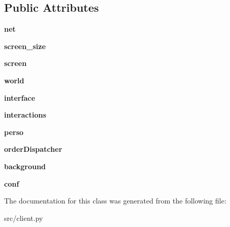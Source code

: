 \subsection*{\-Public \-Attributes}
\begin{DoxyCompactItemize}
\item 
\hypertarget{classsrc_1_1client_1_1_client_a22be7470a4f70a1cd0a5c159221e2080}{{\bfseries net}}\label{classsrc_1_1client_1_1_client_a22be7470a4f70a1cd0a5c159221e2080}

\item 
\hypertarget{classsrc_1_1client_1_1_client_af3c8cfb4d4f64c89d220255c940aed00}{{\bfseries screen\-\_\-size}}\label{classsrc_1_1client_1_1_client_af3c8cfb4d4f64c89d220255c940aed00}

\item 
\hypertarget{classsrc_1_1client_1_1_client_a9abfebcb16149fe59da9775af7ea6a8e}{{\bfseries screen}}\label{classsrc_1_1client_1_1_client_a9abfebcb16149fe59da9775af7ea6a8e}

\item 
\hypertarget{classsrc_1_1client_1_1_client_a0c840b0412f44f9220d5c8e7e346527c}{{\bfseries world}}\label{classsrc_1_1client_1_1_client_a0c840b0412f44f9220d5c8e7e346527c}

\item 
\hypertarget{classsrc_1_1client_1_1_client_a78caa6f9fe676a4af8a46c916b1cb413}{{\bfseries interface}}\label{classsrc_1_1client_1_1_client_a78caa6f9fe676a4af8a46c916b1cb413}

\item 
\hypertarget{classsrc_1_1client_1_1_client_ad17d0fea293dd7c11c67a8783530f203}{{\bfseries interactions}}\label{classsrc_1_1client_1_1_client_ad17d0fea293dd7c11c67a8783530f203}

\item 
\hypertarget{classsrc_1_1client_1_1_client_a87fcde6757dca7443d16211dfcb0780f}{{\bfseries perso}}\label{classsrc_1_1client_1_1_client_a87fcde6757dca7443d16211dfcb0780f}

\item 
\hypertarget{classsrc_1_1client_1_1_client_a0c9576fe6e5e83ce95e13bbcbc50c6a2}{{\bfseries order\-Dispatcher}}\label{classsrc_1_1client_1_1_client_a0c9576fe6e5e83ce95e13bbcbc50c6a2}

\item 
\hypertarget{classsrc_1_1client_1_1_client_a3f509c52aeefc5c3b79a8d44abf61921}{{\bfseries background}}\label{classsrc_1_1client_1_1_client_a3f509c52aeefc5c3b79a8d44abf61921}

\item 
\hypertarget{classsrc_1_1client_1_1_client_aa14ee270dca04bd43794ee04d054cbeb}{{\bfseries conf}}\label{classsrc_1_1client_1_1_client_aa14ee270dca04bd43794ee04d054cbeb}

\end{DoxyCompactItemize}


\-The documentation for this class was generated from the following file\-:\begin{DoxyCompactItemize}
\item 
src/client.\-py\end{DoxyCompactItemize}
